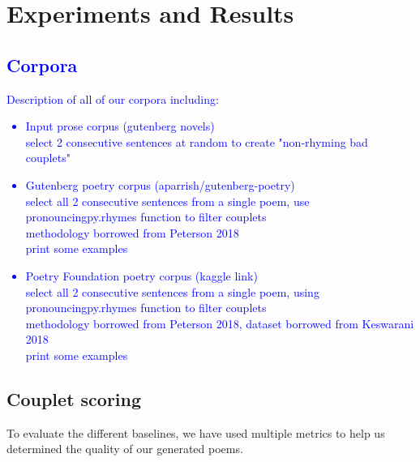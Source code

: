 \documentclass[11pt,a4paper]{article}
\begin{document}
\section{Experiments and Results}
\label{sec:results}

\textcolor{blue}{
\subsection{Corpora}
\label{sec:corpora}
Description of all of our corpora including:
\begin{itemize}
	\item
		Input prose corpus (gutenberg novels)\\
		select 2 consecutive sentences at random to create "non-rhyming bad couplets"
	\item
		Gutenberg poetry corpus (aparrish/gutenberg-poetry)\\
		select all 2 consecutive sentences from a single poem, use pronouncingpy.rhymes function to filter couplets\\
		methodology borrowed from Peterson 2018\\
		print some examples
	\item
		Poetry Foundation poetry corpus (kaggle link)\\
		select all 2 consecutive sentences from a single poem, using pronouncingpy.rhymes function to filter couplets\\
		methodology borrowed from Peterson 2018, dataset borrowed from Keswarani 2018\\
		print some examples
\end{itemize}
}

\subsection{Couplet scoring}
\label{sec:coupletscore}
To evaluate the different baselines, we have used multiple metrics to help us determined the quality of our generated poems.
\end{document}
